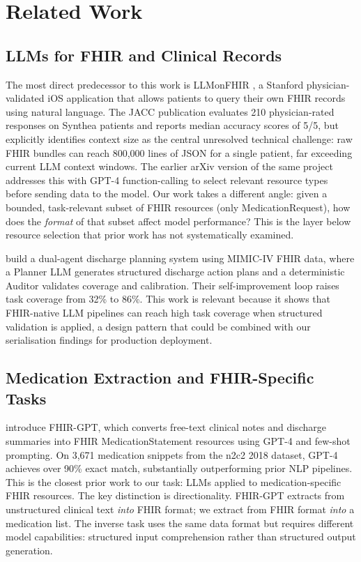 \section{Related Work}
\label{sec:related}

\subsection{LLMs for FHIR and Clinical Records}

The most direct predecessor to this work is LLMonFHIR \citep{schmiedmayer2025llmonfhir},
a Stanford physician-validated iOS application that allows patients to query their
own FHIR records using natural language. The JACC publication evaluates 210 physician-rated
responses on Synthea patients and reports median accuracy scores of 5/5, but explicitly
identifies context size as the central unresolved technical challenge: raw FHIR bundles
can reach 800,000 lines of JSON for a single patient, far exceeding current LLM context
windows. The earlier arXiv version of the same project \citep{schmiedmayer2024llmonfhir}
addresses this with GPT-4 function-calling to select relevant resource types before
sending data to the model. Our work takes a different angle: given a bounded,
task-relevant subset of FHIR resources (only MedicationRequest), how does the
\textit{format} of that subset affect model performance? This is the layer below
resource selection that prior work has not systematically examined.

\citet{wu2026plannerauditor} build a dual-agent discharge planning system using MIMIC-IV
FHIR data, where a Planner LLM generates structured discharge action plans and a
deterministic Auditor validates coverage and calibration. Their self-improvement loop
raises task coverage from 32\% to 86\%. This work is relevant because it shows that
FHIR-native LLM pipelines can reach high task coverage when structured validation is
applied, a design pattern that could be combined with our serialisation findings
for production deployment.

\subsection{Medication Extraction and FHIR-Specific Tasks}

\citet{li2024fhirgpt} introduce FHIR-GPT, which converts free-text clinical notes
and discharge summaries into FHIR MedicationStatement resources using GPT-4 and
few-shot prompting. On 3,671 medication snippets from the n2c2 2018 dataset, GPT-4
achieves over 90\% exact match, substantially outperforming prior NLP pipelines.
This is the closest prior work to our task: LLMs applied to medication-specific
FHIR resources. The key distinction is directionality. FHIR-GPT extracts from
unstructured clinical text \textit{into} FHIR format; we extract from FHIR format
\textit{into} a medication list. The inverse task uses the same data format but
requires different model capabilities: structured input comprehension rather than
structured output generation.

